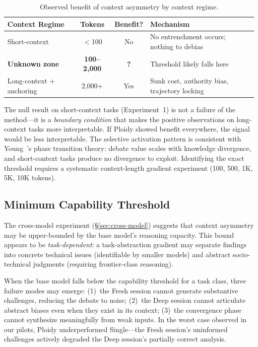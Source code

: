 \documentclass[11pt]{article}
\begin{document}
\begin{table}[H]
\centering
\caption{Observed benefit of context asymmetry by context regime.}
\label{tab:threshold}
\small
\begin{tabular}{@{}lccl@{}}
\toprule
\textbf{Context Regime} & \textbf{Tokens} & \textbf{Benefit?} & \textbf{Mechanism} \\
\midrule
Short-context & $<$100 & No & No entrenchment occurs; nothing to debias \\
\textbf{Unknown zone} & \textbf{100--2,000} & \textbf{?} & Threshold likely falls here \\
Long-context + anchoring & 2,000+ & Yes & Sunk cost, authority bias, trajectory locking \\
\bottomrule
\end{tabular}
\end{table}

The null result on short-context tasks (Experiment~1) is not a failure of the method---it is a \emph{boundary condition} that makes the positive observations on long-context tasks more interpretable. If Ploidy showed benefit everywhere, the signal would be less interpretable. The selective activation pattern is consistent with Young~\citep{young2026divergence}'s phase transition theory: debate value scales with knowledge divergence, and short-context tasks produce no divergence to exploit. Identifying the exact threshold requires a systematic context-length gradient experiment (100, 500, 1K, 5K, 10K tokens).

\subsection{Minimum Capability Threshold}
\label{sec:capability-threshold}

The cross-model experiment (\S\ref{sec:cross-model}) suggests that context asymmetry may be upper-bounded by the base model's reasoning capacity. This bound appears to be \emph{task-dependent}: a task-abstraction gradient may separate findings into concrete technical issues (identifiable by smaller models) and abstract socio-technical judgments (requiring frontier-class reasoning).

When the base model falls below the capability threshold for a task class, three failure modes may emerge: (1)~the Fresh session cannot generate substantive challenges, reducing the debate to noise; (2)~the Deep session cannot articulate abstract biases even when they exist in its context; (3)~the convergence phase cannot synthesize meaningfully from weak inputs. In the worst case observed in our pilots, Ploidy underperformed Single---the Fresh session's uninformed challenges actively degraded the Deep session's partially correct analysis.
\end{document}
